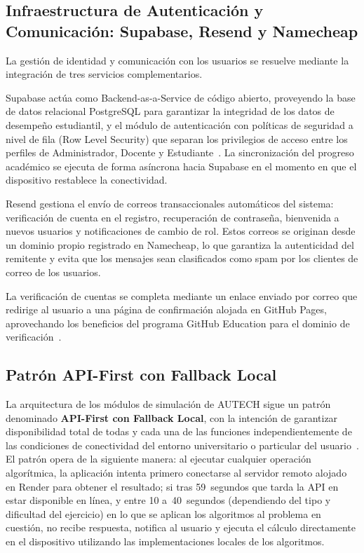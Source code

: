 \subsection{Infraestructura de Autenticación y Comunicación: Supabase, Resend y Namecheap}
\label{ssec:infraestructura_auth}

La gestión de identidad y comunicación con los usuarios se resuelve mediante la integración
de tres servicios complementarios.

Supabase actúa como Backend-as-a-Service de código abierto, proveyendo la base de datos
relacional PostgreSQL para garantizar la integridad de los datos de desempeño estudiantil, y
el módulo de autenticación con políticas de seguridad a nivel de fila (Row Level Security) que
separan los privilegios de acceso entre los perfiles de Administrador, Docente y
Estudiante~\cite{supabase2024}. La sincronización del progreso académico se ejecuta de forma
asíncrona hacia Supabase en el momento en que el dispositivo restablece la conectividad.

Resend gestiona el envío de correos transaccionales automáticos del sistema: verificación de
cuenta en el registro, recuperación de contraseña, bienvenida a nuevos usuarios y
notificaciones de cambio de rol. Estos correos se originan desde un dominio propio registrado
en Namecheap, lo que garantiza la autenticidad del remitente y evita que los mensajes sean
clasificados como spam por los clientes de correo de los usuarios.

La verificación de cuentas se completa mediante un enlace enviado por correo que redirige al
usuario a una página de confirmación alojada en GitHub Pages, aprovechando los beneficios del
programa GitHub Education para el dominio de verificación~\cite{github2024}.

\subsection{Patrón API-First con Fallback Local}
\label{ssec:api_first}

La arquitectura de los módulos de simulación de AUTECH sigue un patrón denominado
\textbf{API-First con Fallback Local}, con la intención de garantizar disponibilidad total de
todas y cada una de las funciones independientemente de las condiciones de conectividad del
entorno universitario o particular del usuario~\cite{pressman2020}. El patrón opera de la
siguiente manera: al ejecutar cualquier operación algorítmica, la aplicación intenta primero
conectarse al servidor remoto alojado en Render para obtener el resultado; si tras 59~segundos
que tarda la API en estar disponible en línea, y entre 10 a~40~segundos (dependiendo del tipo
y dificultad del ejercicio) en lo que se aplican los algoritmos al problema en cuestión, no
recibe respuesta, notifica al usuario y ejecuta el cálculo directamente en el dispositivo
utilizando las implementaciones locales de los algoritmos.

